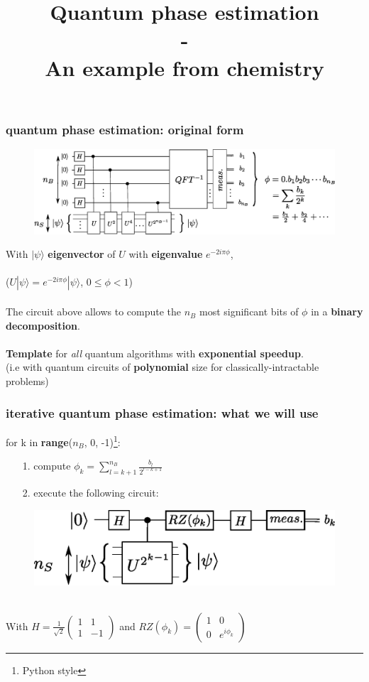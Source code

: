 \documentclass{beamer}
\title{Quantum phase estimation \\-\\ An example from chemistry}
\begin{document}
\frame{\titlepage}

\begin{frame}
\frametitle{quantum phase estimation: original form}
\begin{center}
\begin{figure}
\includegraphics[width=\textwidth]{quantum_phase_estimation.eps}
\end{figure}
\end{center}

With $|\psi\rangle$ \textbf{eigenvector} of $U$ with \textbf{eigenvalue} $e^{-2i\pi\phi}$,\\~\\
 ($U|\psi\rangle = e^{-2i\pi\phi}|\psi\rangle$, $0\leq\phi<1$)\\~\\
The circuit above allows to compute the $n_{B}$ most significant bits of $\phi$ in a \textbf{binary
decomposition}.\\~\\

\textbf{Template} for \emph{all} quantum algorithms with \textbf{exponential speedup}.\\
(i.e with quantum circuits of \textbf{polynomial} size for classically-intractable problems)
\end{frame}

\begin{frame}
\frametitle{iterative quantum phase estimation: what we will use}

{\selectfont for k in \textbf{range}($n_{B}$, 0, -1)\footnote{Python style}:
\begin{itemize}
\item[1.] compute $\phi_{k}=\sum_{l=k+1}^{n_{B}} \frac{b_{l}}{2^{l-k+1}}$
\item[2.] execute the following circuit: 
\end{itemize}
}
\begin{figure}
\includegraphics[width=.6\textwidth]{iterative_pea.eps}
\end{figure}~\\

With $H=\frac{1}{\sqrt{2}}\begin{pmatrix}1 & 1 \\ 1 & -1 \end{pmatrix}$ and 
$RZ(\phi_{k})=\begin{pmatrix} 1 & 0 \\ 0 & e^{i\phi_{k}}\end{pmatrix}$

\end{frame}
\end{document}
